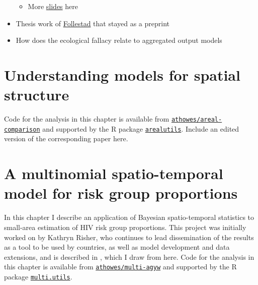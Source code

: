 \documentclass[a4paper, nobind]{templates/ociamthesis}
\providecommand{\tightlist}{%
  \setlength{\itemsep}{0pt}\setlength{\parskip}{0pt}}
\begin{document}
\begin{itemize}
  \begin{itemize}
  \tightlist
  \item
    More \href{https://informatique-mia.inrae.fr/reseau-resste/sites/default/files/2020-09/slides-Lindgren_Avignon2018.pdf}{slides} here
  \end{itemize}
\item
  Thesis work of \href{https://cds.cern.ch/record/639625/files/sis-2003-305.pdf}{Follestad} that stayed as a preprint
\item
  How does the ecological fallacy relate to aggregated output models
\end{itemize}

\hypertarget{understanding-models-for-spatial-structure}{%
\chapter{Understanding models for spatial structure}\label{understanding-models-for-spatial-structure}}

\adjustmtc
{}

Code for the analysis in this chapter is available from \href{https://github.com/athowes/areal-comparison}{\texttt{athowes/areal-comparison}} and supported by the R package \href{https://athowes.github.io/arealutils}{\texttt{arealutils}}.
Include an edited version of the corresponding paper here.

\hypertarget{multi-agyw}{%
\chapter{A multinomial spatio-temporal model for risk group proportions}\label{multi-agyw}}

\adjustmtc
{}

In this chapter I describe an application of Bayesian spatio-temporal statistics to small-area estimation of HIV risk group proportions.
This project was initially worked on by Kathryn Risher, who continues to lead dissemination of the results as a tool to be used by countries, as well as model development and data extensions, and is described in \textcite{howes2022spatio}, which I draw from here.
Code for the analysis in this chapter is available from \href{https://github.com/athowes/multi-agyw}{\texttt{athowes/multi-agyw}} and supported by the R package \href{https://athowes.github.io/multi-agyw}{\texttt{multi.utils}}.
\end{document}
